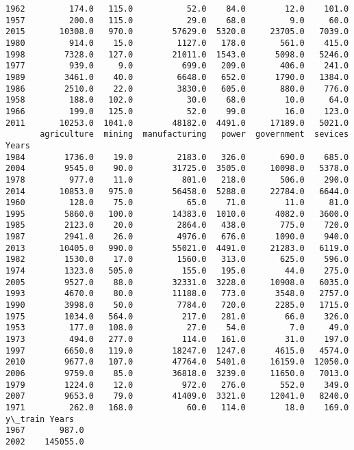 \documentclass[11pt]{article}
\begin{document}
\begin{Verbatim}[commandchars=\\\{\}]
1962         174.0   115.0           52.0    84.0        12.0    101.0
1957         200.0   115.0           29.0    68.0         9.0     60.0
2015       10308.0   970.0        57629.0  5320.0     23705.0   7039.0
1980         914.0    15.0         1127.0   178.0       561.0    415.0
1998        7328.0   127.0        21011.0  1543.0      5098.0   5246.0
1977         939.0     9.0          699.0   209.0       406.0    241.0
1989        3461.0    40.0         6648.0   652.0      1790.0   1384.0
1986        2510.0    22.0         3830.0   605.0       880.0    776.0
1958         188.0   102.0           30.0    68.0        10.0     64.0
1966         199.0   125.0           52.0    99.0        16.0    123.0
2011       10253.0  1041.0        48182.0  4491.0     17189.0   5021.0
       agriculture  mining  manufacturing   power  government  sevices
Years                                                                 
1984        1736.0    19.0         2183.0   326.0       690.0    685.0
2004        9545.0    90.0        31725.0  3505.0     10098.0   5378.0
1978         977.0    11.0          801.0   218.0       506.0    290.0
2014       10853.0   975.0        56458.0  5288.0     22784.0   6644.0
1960         128.0    75.0           65.0    71.0        11.0     81.0
1995        5860.0   100.0        14383.0  1010.0      4082.0   3600.0
1985        2123.0    20.0         2864.0   438.0       775.0    720.0
1987        2941.0    26.0         4976.0   676.0      1090.0    940.0
2013       10405.0   990.0        55021.0  4491.0     21283.0   6119.0
1982        1530.0    17.0         1560.0   313.0       625.0    596.0
1974        1323.0   505.0          155.0   195.0        44.0    275.0
2005        9527.0    88.0        32331.0  3228.0     10908.0   6035.0
1993        4670.0    80.0        11188.0   773.0      3548.0   2757.0
1990        3998.0    50.0         7784.0   720.0      2285.0   1715.0
1975        1034.0   564.0          217.0   281.0        66.0    326.0
1953         177.0   108.0           27.0    54.0         7.0     49.0
1973         494.0   277.0          114.0   161.0        31.0    197.0
1997        6650.0   119.0        18247.0  1247.0      4615.0   4574.0
2010        9677.0   107.0        47764.0  5401.0     16159.0  12050.0
2006        9759.0    85.0        36818.0  3239.0     11650.0   7013.0
1979        1224.0    12.0          972.0   276.0       552.0    349.0
2007        9653.0    79.0        41409.0  3321.0     12041.0   8240.0
1971         262.0   168.0           60.0   114.0        18.0    169.0
y\_train Years
1967       987.0
2002    145055.0

\end{Verbatim}
\end{document}
